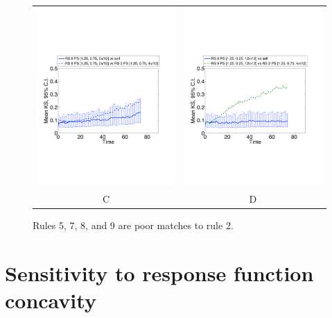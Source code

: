 \documentclass[12pt]{article}
\begin{document}
\begin{figure}[htp]
\begin{tabular}{cc}
	\includegraphics[width=3.25in]{figures/KSstat_RS08PS023_vs_RS02PS027.pdf} & \includegraphics[width=3.25in]{figures/KSstat_RS09PS008_vs_RS02PS027.pdf} \\
	C & D
\end{tabular}
\caption{Rules 5, 7, 8, and 9 are poor matches to rule 2.}
\label{ksstatsopp2}
\end{figure}


\section{Sensitivity to response function concavity}\label{app:kappa}
\end{document}

